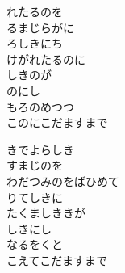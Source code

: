 \documentclass[10pt,b5j]{tarticle} %
\begin{document}
\vspace{1.5em} %
\newcommand{\linespace}{0.5em} %
\newcommand{\blocksize}{0.5\hsize} %
\begin{enumerate} %
    \begin{minipage}[c]{\blocksize}
    
        \vspace{\linespace}
        \item
        れたるのを\\
        るまじらがに\\
        ろしきにち\\
        けがれたるのに\\
        しきのが\\
        のにし\\
        もろのめつつ\\
        このにこだますまで
        
        \vspace{\linespace}
        \item
        きでよらしき\\
        すまじのを\\
        わだつみのをばひめて\\
        りてしきに\\
        たくましききが\\
        しきにし\\
        なるをくと\\
        こえてこだますまで
    
    \end{minipage}
\end{enumerate} %
\end{document}

